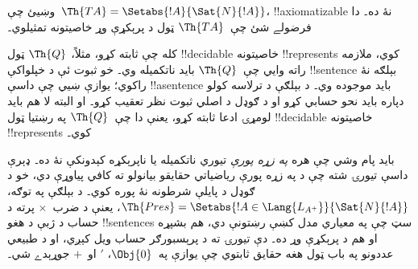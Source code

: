 \documentclass[../../../include/open-logic-section]{subfiles}
\begin{document}
\begin{prob}
وښيئ چې~$\Th{TA} = \Setabs{!A}{\Sat{N}{!A}}$، !!{axiomatizable} نۀ
ده۔ دا فرضولے شئ چې~$\Th{TA}$ ټول د پرېکړې وړ خاصيتونه تمثيلوي۔
\end{prob}

کله چې ثابته کړو، مثلاً، $\Th{Q}$ ټول !!{decidable} خاصيتونه
!!{represents} کوي، ملازمه راته وايي چې~$\Th{Q}$ بايد ناتکميله وي۔
خو ثبوت ئې د خپلواکې !!{sentence} بېلګه نۀ راکوي؛ يوازې ښيي چې داسې
!!a{sentence} بايد موجوده وي۔ د بېلګې د ترلاسه کولو دپاره بايد نحو
حسابي کړو او د ګوډل د اصلي ثبوت نظر تعقيب کړو۔ او البته لا هم بايد
لومړۍ ادعا ثابته کړو، يعنې دا چې~$\Th{Q}$ په رښتيا ټول !!{decidable}
خاصيتونه !!{represents} کوي۔

بايد پام وشي چې هره \emph{په زړه پورې} تيوري ناتکميله يا ناپرېکړه
کېدونکې نۀ ده۔ ډېرې داسې تيورۍ شته چې د په زړه پورې رياضياتي حقايقو
بيانولو ته کافي پياوړې دي، خو د ګوډل د پايلې شرطونه نۀ پوره کوي۔ د
بېلګې په توګه،
$\Th{Pres} = \Setabs{!A \in \Lang{L_{A^+}}}{\Sat{N}{!A}}$، يعنې د
ضرب~$\times$ پرته د حساب د ژبې د هغو !!{sentence}s سټ چې په معياري
مدل کښې رښتونې دي، هم بشپړه او هم د پرېکړې وړ ده۔ دې تيورۍ ته د
پرېسبورګر حساب ويل کېږي، او د طبيعي عددونو په باب ټول هغه حقايق
ثابتوي چې يوازې په~$\Obj{0}$، $\prime$ او~$+$ جوړېدے شي۔
\end{document}
